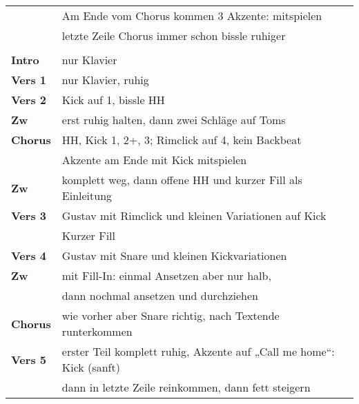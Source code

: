 


\begin{tabular}{p{1.6cm}l}
	                & Am Ende vom Chorus kommen 3 Akzente: mitspielen                      \\
	                & letzte Zeile Chorus immer schon bissle ruhiger                       \\
	                &                                                                      \\
	\textbf{Intro}  & nur Klavier                                                          \\
	\textbf{Vers 1} & nur Klavier, ruhig                                                   \\
	\textbf{Vers 2} & Kick auf 1, bissle HH                                                \\
	\textbf{Zw}     & erst ruhig halten, dann zwei Schläge auf Toms                        \\
	\textbf{Chorus} & HH, Kick 1, 2+, 3; Rimclick auf 4, kein Backbeat                     \\
	                & Akzente am Ende mit Kick mitspielen                                  \\
	\textbf{Zw}     & komplett weg, dann offene HH und kurzer Fill als Einleitung          \\
	\textbf{Vers 3} & Gustav mit Rimclick und kleinen Variationen auf Kick                 \\
	                & Kurzer Fill                                                          \\
	\textbf{Vers 4} & Gustav mit Snare und kleinen Kickvariationen                         \\
	\textbf{Zw}     & mit Fill-In: einmal Ansetzen aber nur halb,                          \\
	                & dann nochmal ansetzen und durchziehen                                \\
	\textbf{Chorus} & wie vorher aber Snare richtig, nach Textende runterkommen            \\
	\textbf{Vers 5} & erster Teil komplett ruhig, Akzente auf „Call me home“: Kick (sanft) \\
	                & dann in letzte Zeile reinkommen, dann fett steigern                  \\

\end{tabular}
